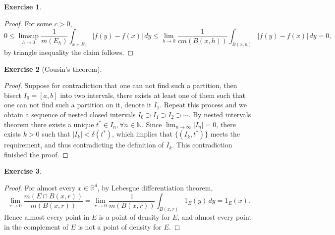 \documentclass[a4paper]{article}
\newtheorem{ex}{Exercise}[subsection]
\begin{document}
\begin{ex}\end{ex}\begin{proof}
For some $c > 0$, $$
0 \leq \limsup_{h \to 0}\frac{1}{m(E_h)}\int_{x + E_h}|f(y) - f(x)|\,dy\leq \lim_{h \to 0}\frac{1}{cm(B(x, h))}
\int_{B(x, h)}|f(y) - f(x)|\,dy = 0,
$$by triangle inequality the claim follows.
\end{proof}

\setcounter{ex}{22}\begin{ex}[Cousin's theorem]\end{ex}\begin{proof}
Suppose for contradiction that one can not find such a partition, then bisect $I_0 = [a, b]$ into two intervals, 
there exists at least one of them such that one can not find such a partition on it, denote it $I_1$. Repeat this process
and we obtain a sequence of nested closed intervals $I_0 \supset I_1 \supset I_2 \supset \cdots$. By nested intervals
theorem there exists a unique $t^* \in I_n, \forall n \in \mathbb{N}$. Since $\lim_{n \to \infty} |I_n| = 0$, there exists 
$k > 0$ such that $|I_k| < \delta(t^*)$, which implies that $\{(I_k, t^*)\}$ meets the requirement, and thus contradicting
the definition of $I_k$. This contradiction finished the proof.
\end{proof}

\begin{ex}\end{ex}\begin{proof}
For almost every $x \in \mathbb{R}^d$, by Lebesgue differentiation theorem,$$
\lim_{r \to 0} \frac{m(E \cap B(x, r))}{m(B(x, r))} = \lim_{r\to 0}\frac{1}{m(B(x, r))}\int_{B(x, r)} 1_E(y)\,dy = 1_E(x).
$$Hence almost every point in $E$ is a point of density for $E$, and almost every point in the complement of $E$ 
is not a point of density for $E$.
\end{proof}
\end{document}
